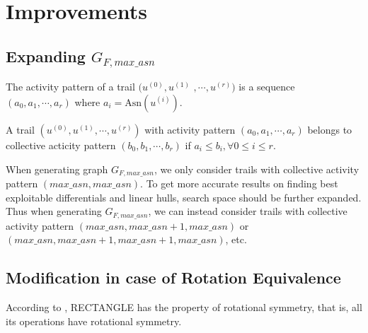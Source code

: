 


\section{Improvements}\label{sec:improvements}

\subsection{Expanding $G_{F,max\_asn}$}

\begin{definition}
	The activity pattern of a trail $(u^{(0)},u^{(1)}$ $,\cdots,u^{(r)})$ is a sequence $(a_0,a_1,\cdots,a_r)$ where $a_i=\text{Asn}(u^{(i)})$. 
\end{definition}

\begin{definition}
	A trail $(u^{(0)},u^{(1)},\cdots,u^{(r)})$ with activity pattern $(a_0,a_1,\cdots,a_r)$ belongs to collective acticity pattern $(b_0,b_1,\cdots,b_r)$ if $a_i\leq b_i,\forall 0\leq i\le r$. 
\end{definition}

When generating graph $G_{F,max\_asn}$, we only consider trails with collective activity pattern $(max\_asn,max\_asn)$. To get more accurate results on finding best exploitable differentials and linear hulls, search space should be further expanded. Thus when generating $G_{F,max\_asn}$, we can instead consider trails with collective activity pattern $(max\_asn, max\_asn+1, max\_asn)$ or $(max\_asn, max\_asn+1, max\_asn+1, max\_asn)$, etc.

\subsection{Modification in case of Rotation Equivalence}

According to \cite{ZBL15}, RECTANGLE has the property of rotational symmetry, that is, all its operations have rotational symmetry. 

